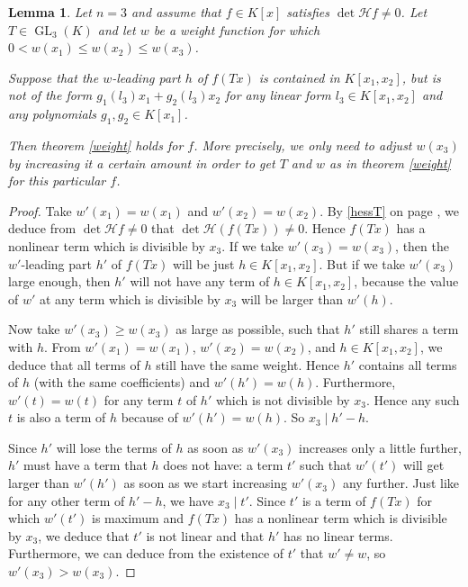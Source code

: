 \documentclass[10pt]{article}
\newtheorem{lemma}[theorem]{Lemma}
\theoremstyle{remark}
\theoremstyle{definition}
\newcommand{\hess}{{\mathcal H}}
\newcommand{\GL}{\operatorname{GL}}
\begin{document}
\begin{lemma} \label{weight2}
Let $n = 3$ and assume that $f \in K[x]$ satisfies $\det \hess f \ne 0$. 
Let $T \in \GL_3(K)$ and let $w$ be a weight function for which 
$0 < w(x_1) \le w(x_2) \le w(x_3)$. 

Suppose that the $w$-leading part $h$ of $f(Tx)$ is contained in $K[x_1,x_2]$, but is
not of the form $g_1(l_3) x_1 + g_2(l_3) x_2$ for any linear form $l_3 \in K[x_1,x_2]$
and any polynomials $g_1, g_2 \in K[x_1]$. 

Then theorem \ref{weight} holds for $f$. More precisely, we only need to adjust $w(x_3)$
by increasing it a certain amount in order to get $T$ and $w$ as in theorem \ref{weight} 
for this particular $f$.
\end{lemma}

\begin{proof}
Take $w'(x_1) = w(x_1)$ and $w'(x_2) = w(x_2)$. By \eqref{hessT} on page \pageref{hessT}, 
we deduce from $\det \hess f \ne 0$ that $\det \hess (f(Tx)) \ne 0$. Hence $f(Tx)$ has a nonlinear term
which is divisible by $x_3$. If we take $w'(x_3) = w(x_3)$, then the $w'$-leading part $h'$ of $f(Tx)$ 
will be just $h \in K[x_1,x_2]$. But if we take $w'(x_3)$ large enough, then $h'$ will not have
any term of $h \in K[x_1,x_2]$, because the value of $w'$ at any term which is divisible by $x_3$ will be 
larger than $w'(h)$. 

Now take $w'(x_3) \ge w(x_3)$ as large as possible, such that $h'$ still shares a 
term with $h$. 
From $w'(x_1) = w(x_1)$, $w'(x_2) = w(x_2)$, and $h \in K[x_1,x_2]$, we deduce
that all terms of $h$ still have the same weight. Hence $h'$ contains all terms of $h$
(with the same coefficients)
and $w'(h') = w(h)$. Furthermore, $w'(t) = w(t)$ for any term $t$ of $h'$ which is not 
divisible by $x_3$. Hence any such $t$ is also a term of $h$ because of $w'(h') = w(h)$. So
$x_3 \mid h' - h$.

Since $h'$ will lose the terms of $h$ as soon as $w'(x_3)$ increases only a little further,
$h'$ must have a term that $h$ does not have: a term $t'$ such that $w'(t')$ will get larger 
than $w'(h')$ as soon as we start increasing $w'(x_3)$ any further. Just like for any other
term of $h' - h$, we have $x_3 \mid t'$. Since $t'$ is a term of $f(Tx)$ for which $w'(t')$ is maximum 
and $f(Tx)$ has a nonlinear term which is divisible by $x_3$, we deduce that $t'$ is not linear 
and that $h'$ has no linear terms. Furthermore, we can deduce from the existence of $t'$ that 
$w' \ne w$, so $w'(x_3) > w(x_3)$.


\end{proof}
\end{document}
